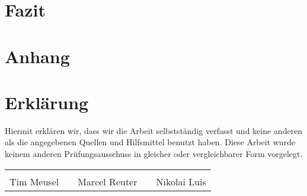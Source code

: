 \section{Fazit}

\newpage

\appendix

\printglossaries%

\printbibliography[heading=bibnumbered]

\section{Anhang}




\newpage

\section{Erklärung}
Hiermit erklären wir, dass wir die Arbeit selbstständig verfasst und keine
anderen als die angegebenen Quellen und Hilfsmittel benutzt haben. Diese Arbeit
wurde keinem anderen Prüfungsausschuss in gleicher oder vergleichbarer Form
vorgelegt.

\vfill
{\centering
\renewcommand{\arraystretch}{0.9}
\begin{tabular}{p{}p{}p{}p{}p{}}
  \dotfill                    & & \dotfill                      & & \dotfill \\
  \centering\footnotesize{Tim Meusel}& & \centering\footnotesize{Marcel Reuter}& & \centering\footnotesize{Nikolai Luis}%
\end{tabular}
}

